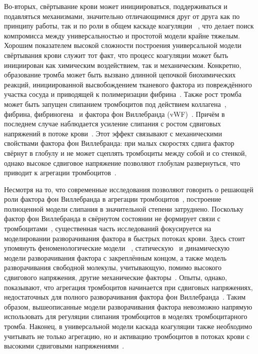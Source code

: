Во-вторых, свёртывание крови может инициироваться, поддерживаться и подавляться механизмами,
значительно отличающимися друг от друга как по принципу работы, так и по роли в общем каскаде коагуляции%
~\cite{rasche2001haemostasis_overview},
что делает поиск компромисса между универсальностью и простотой модели крайне тяжелым.
Хорошим показателем высокой сложности построения универсальной модели свёртывания крови
служит тот факт, что процесс коагуляции может быть инициирован как химическим воздействием,
так и механическим.
Конкретно, образование тромба может быть вызвано длинной цепочкой биохимических реакций,
инициированной высвобождением тканевого фактора из повреждённого участка сосуда
и приводящей к полимеризации фибрина~\cite{rasche2001haemostasis_overview, panteleev2008coagulation, ushakova2018gemo}.
Также рост тромба может быть запущен слипанием тромбоцитов под действием коллагена~\cite{rasche2001haemostasis_overview, rahman2019platelet_adhesion},
фибрина, фибриногена~\cite{savage1996platelet_adhesion, rahman2019platelet_adhesion}
и фактора фон Виллебранда (vWF)~\cite{savage1996platelet_adhesion, rahman2019platelet_adhesion, avtaeva2022vWF}.
Причём в последнем случае наблюдается усиление слипания с ростом сдвиговых напряжений в потоке крови~\cite{savage1996platelet_adhesion, rahman2019platelet_adhesion}.
Этот эффект связывают с механическими свойствами фактора фон Виллебранда:
при малых скоростях сдвига фактор свёрнут в глобулу
и не может сцеплять тромбоциты между собой и со стенкой,
однако высокое сдвиговое напряжение позволяют глобулам развернуться,
что приводит к агрегации тромбоцитов~\cite{lippok2016vWF_unfolding, schneider2007vWF_unfolding, zhussupbekov2021vWF_unfolding}.

Несмотря на то, что современные исследования позволяют говорить о
решающей роли фактора фон Виллебранда в агрегации тромбоцитов~\cite{lauren2015high_shear_rate_thrombosis, mereuta2021white_clots},
построение полноценной модели слипания в значительной степени затруднено.
Поскольку фактор фон Виллебранда в свёрнутом состоянии не формирует связи с тромбоцитами~\cite{avtaeva2022vWF},
существенная часть исследований фокусируется на моделировании разворачивания фактора в быстрых потоках крови.
Здесь стоит упомянуть феноменологические модели%
~\cite{lippok2016vWF_unfolding, schneider2007vWF_unfolding},
статическую~\cite{zlobina2016vWF_unfolding} и динамическую~\cite{pushin2020vWF_unfolding} модели разворачивания фактора с закреплённым концом,
а также модель разворачивания свободной молекулы,
учитывающую, помимо высокого сдвигового напряжения, другие механические факторы~\cite{zhussupbekov2021vWF_unfolding}.
Опыты, однако, показывают, что агрегация тромбоцитов начинается при сдвиговых напряжениях,
недостаточных для полного разворачивания фактора фон Виллебранда~\cite{savage1996platelet_adhesion, rahman2019platelet_adhesion}.
Таким образом, вышеописанные модели разворачивания фактора невозможно напрямую использовать для регуляции
слипания тромбоцитов в моделях тромбоцитарного тромба.
Наконец, в универсальной модели каскада коагуляции также необходимо учитывать не только агрегацию,
но и активацию тромбоцитов в потоках крови с высокими сдвиговыми напряжениями~\cite{lauren2015high_shear_rate_thrombosis, rasche2001haemostasis_overview}.

